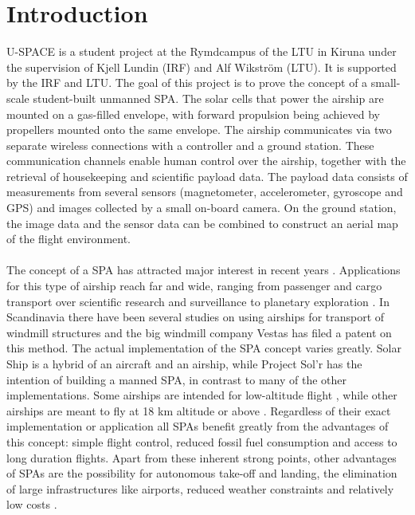 \newpage
\chapter{Introduction}
\label{chap:introduction}

\enlargethispage{2.0em}

\ac{U-SPACE} is a student project at the Rymdcampus of the \ac{LTU} in Kiruna under the supervision of Kjell Lundin (\ac{IRF}) and Alf Wikström (\ac{LTU}). It is supported by the \ac{IRF} and \ac{LTU}. The goal of this project is to prove the concept of a small-scale student-built unmanned \ac{SPA}. The solar cells that power the airship are mounted on a gas-filled envelope, with forward propulsion being achieved by propellers mounted onto the same envelope. The airship communicates via two separate wireless connections with a controller and a ground station. These communication channels enable human control over the airship, together with the retrieval of housekeeping and scientific payload data. The payload data consists of measurements from several sensors (magnetometer, accelerometer, gyroscope and \ac{GPS}) and images collected by a small on-board camera. On the ground station, the image data and the sensor data can be combined to construct an aerial map of the flight environment.
\\
\\
The concept of a \ac{SPA} has attracted major interest in recent years \cite{website:ravenaerostar, website:gaya, poster:saba, report:colozza2004, website:solr, website:ISIS, website:helios, website:solarship, website:knarr}. Applications for this type of airship reach far and wide, ranging from passenger and cargo transport \cite{website:gaya, website:solr, website:helios, website:solarship} over scientific research \cite{poster:saba} and surveillance \cite{website:ravenaerostar, website:ISIS, website:helios} to planetary exploration \cite{report:colozza2004}. In Scandinavia there have been several studies on using airships for transport of windmill structures\cite{website:knarr, website:energimyndigheten} and the big windmill company Vestas has filed a patent on this method\cite{website:vestas}. The actual implementation of the \ac{SPA} concept varies greatly. Solar Ship \cite{website:solarship} is a hybrid of an aircraft and an airship, while Project Sol'r \cite{website:solr} has the intention of building a manned \ac{SPA}, in contrast to many of the other implementations. Some airships are intended for low-altitude flight \cite{website:solr, website:helios}, while other airships are meant to fly at 18 km altitude or above \cite{website:ravenaerostar, poster:saba, website:ISIS}. Regardless of their exact implementation or application all \ac{SPA}s benefit greatly from the advantages of this concept: simple flight control, reduced fossil fuel consumption and access to long duration flights. Apart from these inherent strong points, other advantages of \ac{SPA}s are the possibility for autonomous take-off and landing, the elimination of large infrastructures like airports, reduced weather constraints and relatively low costs \cite{website:ravenaerostar, website:gaya}.

